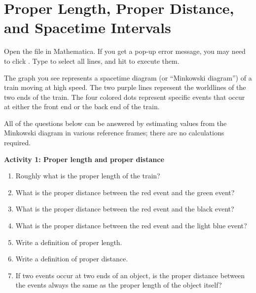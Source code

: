 \section{Proper Length, Proper Distance, and Spacetime Intervals}

\makelabheader %

\bigskip

Open the file  in Mathematica. If you get a pop-up error message, you may need to click . Type  to select all lines, and hit  to execute them.

The graph you see represents a spacetime diagram (or ``Minkowski diagram'') of a train moving at high speed. The two purple lines represent the worldlines of the two ends of the train. The four colored dots represent specific events that occur at either the front end or the back end of the train.

All of the questions below can be answered by estimating values from the Minkowski diagram in various reference frames; there are no calculations required.

\textbf{Activity 1: Proper length and proper distance}

\begin{enumerate}[labparts]
\item Roughly what is the proper length of the train?
\answerspace{0.6in}

\item What is the proper distance between the red event and the green event?
\answerspace{0.6in}

\item What is the proper distance between the red event and the black event?
\answerspace{0.6in}

\item What is the proper distance between the red event and the light blue event?
\answerspace{0.6in}

\item Write a definition of proper length.
\answerspace{0.7in}

\item Write a definition of proper distance.
\answerspace{0.7in}

\item If two events occur at two ends of an object, is the proper distance between the events always the same as the proper length of the object itself?
\answerspace{0.7in}
\end{enumerate}

